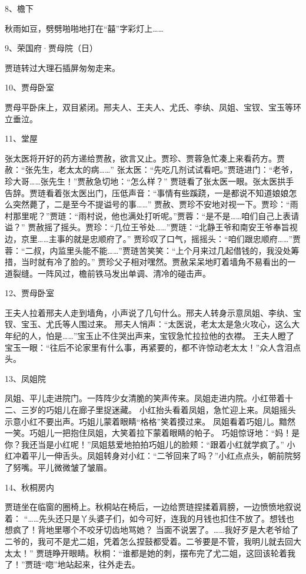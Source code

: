 8、檐下\par
秋雨如豆，劈劈啪啪地打在“囍”字彩灯上……

9、荣国府·贾母院（日）\par
贾琏转过大理石插屏匆匆走来。

10、贾母卧室\par
贾母平卧床上，双目紧闭。邢夫人、王夫人、尤氏、李纨、凤姐、宝钗、宝玉等环立垂泣。

11、堂屋\par
张太医将开好的药方递给贾赦，欲言又止。贾珍、贾蓉急忙凑上来看药方。贾赦：“张先生，老太太的病……”
张太医：“先吃几剂试试看吧。”贾琏进门：“老爷，珍大哥……张先生！”贾赦急切地：“怎么样？”
贾琏看了张太医一眼。张太医拱手告辞。贾琏看着张太医出门，压低声音：“事情有些蹊跷，一是都说不知道娘娘怎么突然薨了，二是至今不提谥号的事……”
贾赦、贾珍不安地对视一下。贾珍：“雨村那里呢？”贾琏：“雨村说，他也满处打听呢。”贾蓉：“是不是……咱们自己上表请谥？”
贾赦摇了摇头。贾珍：“几位王爷处……”贾琏：“北静王爷和南安王爷奉旨视边，京里……主事的就是忠顺府了。”
贾珍叹了口气，摇摇头：“咱们跟忠顺府……”贾蓉：“二叔，内监里头能不能……”贾琏苦笑笑：“上个月来过几起借钱的，我没处筹措，当时就有冷了脸的。”
贾珍父子相对嘿然。贾赦呆呆地盯着墙角不易看出的一道裂缝。一阵风过，檐前铁马发出单调、清冷的碰击声。

12、贾母卧室\par
王夫人拉着邢夫人走到墙角，小声说了几句什么。邢夫人转身示意凤姐、李纨、宝钗、宝玉、尤氏等人围过来。
邢夫人悄声：“太医说，老太太是急火攻心，这么大年纪的人，怕是……”宝玉止不住哭出声来，宝钗急忙拉拉他的衣襟。
王夫人瞪了宝玉一眼：“往后不论家里有什么事，再紧要的，都不许惊动老太太！”众人含泪点头。

13、凤姐院\par
凤姐、平儿走进院门。一阵阵少女清脆的笑声传来。凤姐走进内院。小红带着十二、三岁的巧姐儿在廊子里捉迷藏。
小红抬头看着凤姐，急忙迎上来。凤姐摇头示意小红不要出声。巧姐儿蒙着眼睛“格格”笑着摸过来。
凤姐看着巧姐儿。黯然一笑。巧姐儿一把抱住凤姐，大笑着拉下蒙着眼睛的帕子。
巧姐惊讶地：“妈！是你？我还当是小红呢！”凤姐慈爱地拍拍巧姐儿的脸颊：“跟着小红就学疯了。”
小红冲着平儿一伸舌头。凤姐转身对小红：“二爷回来了吗？”小红点点头，朝前院努了努嘴。平儿微微皱了皱眉。

14、秋桐房内\par
贾琏坐在临窗的圈椅上。秋桐站在椅后，一边给贾琏捏揉着肩膀，一边愤愤地叙说着：
“……先头还只是丫头婆子们，如今可好，连我的月钱也扣住不放了。想钱也想疯了！背地里哪个不咬牙切齿地骂她？
当面不说罢了。……我好歹是大老爷给了二爷的，我可不是尤二姐，凭着怎么捏鼓都受着。二爷要是不管，我明儿就去回大太太！”
贾琏睁开眼睛。秋桐：“谁都是她的刺，摆布完了尤二姐，这回该轮着我了！”贾琏“唿”地站起来，往外走去。

